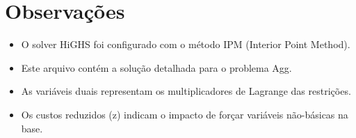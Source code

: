 \documentclass[12pt]{article}
\begin{document}
\section{Observações}

\begin{itemize}
\item O solver HiGHS foi configurado com o método IPM (Interior Point Method).
\item Este arquivo contém a solução detalhada para o problema Agg.
\item As variáveis duais representam os multiplicadores de Lagrange das restrições.
\item Os custos reduzidos (z) indicam o impacto de forçar variáveis não-básicas na base.
\end{itemize}
\end{document}

